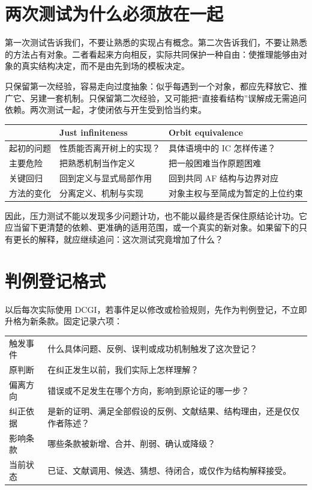 \documentclass[UTF8,zihao=-4,fontset=none,oneside,openany]{ctexbook}
\begin{document}
\section{两次测试为什么必须放在一起}
第一次测试告诉我们，不要让熟悉的实现占有概念。第二次告诉我们，不要让熟悉的方法占有对象。二者看起来方向相反，实际共同保护一种自由：使推理能够由对象的真实结构决定，而不是由先到场的模板决定。

只保留第一次经验，容易走向过度抽象：似乎每遇到一个对象，都应先释放它、推广它、另建一套机制。只保留第二次经验，又可能把“直接看结构”误解成无需追问依赖。两次测试一起，才使闭依与开生受到恰当约束。

\begin{center}
\small
\begin{tabularx}{\textwidth}{@{}p{25mm}XX@{}}
\toprule
 & \textbf{Just infiniteness} & \textbf{Orbit equivalence}\\
\midrule
起初的问题 & 性质能否离开树上的实现？ & 具体语境中的 IC 怎样传递？\\[5pt]
主要危险 & 把熟悉机制当作定义 & 把一般困难当作原题困难\\[5pt]
关键回归 & 回到定义与显式局部作用 & 回到共同 AF 结构与边界对应\\[5pt]
方法的变化 & 分离定义、机制与实现 & 对象主权与至简成为暂定的上位约束\\
\bottomrule
\end{tabularx}
\end{center}

因此，压力测试不能以发现多少问题计功，也不能以最终是否保住原结论计功。它应当留下更清楚的依赖、更准确的适用范围，或一个真实的新对象。如果留下的只有更长的解释，就应继续追问：这次测试究竟增加了什么？


\section{判例登记格式}
以后每次实际使用 DCGI，若事件足以修改或检验规则，先作为判例登记，不立即升格为新条款。固定记录六项：

\begin{tabularx}{\textwidth}{@{}p{30mm}X@{}}
\toprule
触发事件 & 什么具体问题、反例、误判或成功机制触发了这次登记？\\
原判断 & 在纠正发生以前，我们实际上怎样理解？\\
偏离方向 & 错误或不足发生在哪个方向，影响到原论证的哪一步？\\
纠正依据 & 是新的证明、满足全部假设的反例、文献结果、结构理由，还是仅仅作者陈述？\\
影响条款 & 哪些条款被新增、合并、削弱、确认或降级？\\
当前状态 & 已证、文献调用、候选、猜想、待闭合，或仅作为结构解释接受。\\
\bottomrule
\end{tabularx}
\end{document}

